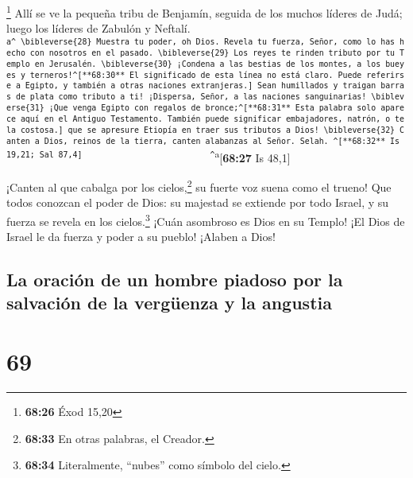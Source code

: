 \footnote{\textbf{68:26} Éxod 15,20}  Allí se ve la
pequeña tribu de Benjamín, seguida de los muchos líderes de Judá; luego
los líderes de Zabulón y Neftalí.
\textsuperscript{\texttt{a\^{}\ \textbackslash{}bibleverse\{28\}\ Muestra\ tu\ poder,\ oh\ Dios.\ Revela\ tu\ fuerza,\ Señor,\ como\ lo\ has\ hecho\ con\ nosotros\ en\ el\ pasado.\ \textbackslash{}bibleverse\{29\}\ Los\ reyes\ te\ rinden\ tributo\ por\ tu\ Templo\ en\ Jerusalén.\ \textbackslash{}bibleverse\{30\}\ ¡Condena\ a\ las\ bestias\ de\ los\ montes,\ a\ los\ bueyes\ y\ terneros!\^{}{[}**68:30**\ El\ significado\ de\ esta\ línea\ no\ está\ claro.\ Puede\ referirse\ a\ Egipto,\ y\ también\ a\ otras\ naciones\ extranjeras.{]}\ Sean\ humillados\ y\ traigan\ barras\ de\ plata\ como\ tributo\ a\ ti!\ ¡Dispersa,\ Señor,\ a\ las\ naciones\ sanguinarias!\ \textbackslash{}bibleverse\{31\}\ ¡Que\ venga\ Egipto\ con\ regalos\ de\ bronce;\^{}{[}**68:31**\ Esta\ palabra\ solo\ aparece\ aquí\ en\ el\ Antiguo\ Testamento.\ También\ puede\ significar\ embajadores,\ natrón,\ o\ tela\ costosa.{]}\ que\ se\ apresure\ Etiopía\ en\ traer\ sus\ tributos\ a\ Dios!\ \textbackslash{}bibleverse\{32\}\ Canten\ a\ Dios,\ reinos\ de\ la\ tierra,\ canten\ alabanzas\ al\ Señor.\ Selah.\ \^{}{[}**68:32**\ Is\ 19,21;\ Sal\ 87,4{]}\ \ \ \ \ \ \ \ \ \ \ \ \ \ \ \ \ \ \ \ \ \ \ \ \ \ \ \^{}}a}{[}\textbf{68:27}
Is 48,1{]}

 ¡Canten al que cabalga por los cielos,\footnote{\textbf{68:33}
  En otras palabras, el Creador.} su fuerte voz suena como el trueno!
 Que todos conozcan el poder de Dios: su majestad se
extiende por todo Israel, y su fuerza se revela en los
cielos.\footnote{\textbf{68:34} Literalmente, ``nubes'' como símbolo del
  cielo.}  ¡Cuán asombroso es Dios en su Templo! ¡El Dios
de Israel le da fuerza y poder a su pueblo! ¡Alaben a Dios!

\hypertarget{la-oraciuxf3n-de-un-hombre-piadoso-por-la-salvaciuxf3n-de-la-verguxfcenza-y-la-angustia}{%
\subsection{La oración de un hombre piadoso por la salvación de la
vergüenza y la
angustia}\label{la-oraciuxf3n-de-un-hombre-piadoso-por-la-salvaciuxf3n-de-la-verguxfcenza-y-la-angustia}}

\hypertarget{section-68}{%
\section{69}\label{section-68}}

